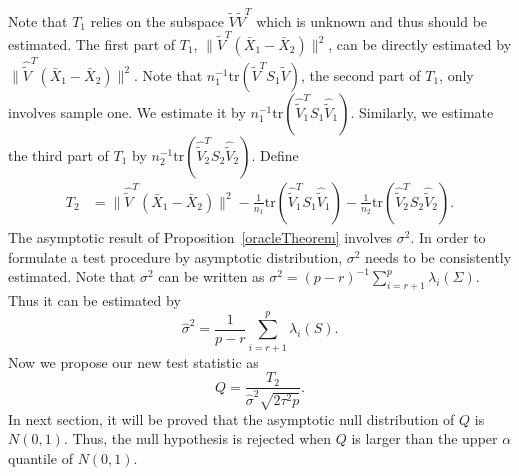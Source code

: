 \documentclass[review]{elsarticle}
\theoremstyle{plain}
\theoremstyle{definition}
\newtheorem{remark}{\quad\quad Remark}
\theoremstyle{remark}
\begin{document}
Note that $T_1$ relies on the subspace $\tilde{V}\tilde{V}^T$ which is unknown and thus should be estimated.
The first part of $T_1$, $\|\tilde{V}^T (\bar{X}_1-\bar{X}_2)\|^2$,
 can be directly estimated by $\|\hat{\tilde{V}}^T (\bar{X}_1-\bar{X}_2)\|^2$.
Note that ${n_1^{-1}}\mathrm{tr}(\tilde{V}^T S_1\tilde{V})$, the second part of $T_1$, only involves sample one.
We estimate it by ${n_1^{-1}}\mathrm{tr}(\hat{\tilde{V}}_1^T S_1\hat{\tilde{V}}_1)$.
Similarly, we estimate the third part of $T_1$ by ${n_2^{-1}}\mathrm{tr}(\hat{\tilde{V}}_2^T S_2\hat{\tilde{V}}_2)$.
Define
\begin{equation*}
\begin{aligned}
    T_2&=\|\hat{\tilde{V}}^T(\bar{X}_1-\bar{X}_2)\|^2-\frac{1}{n_1}\mathrm{tr}(\hat{\tilde{V}}_1^T S_1\hat{\tilde{V}}_1)-\frac{1}{n_2}\mathrm{tr}(\hat{\tilde{V}}_2^T S_2\hat{\tilde{V}}_2).
\end{aligned}
\end{equation*}
The asymptotic result of Proposition~\ref{oracleTheorem} involves $\sigma^2$.
In order to formulate a test procedure by asymptotic distribution, $\sigma^2$ needs to be consistently estimated.
Note that $\sigma^2$ can be written as
    $\sigma^2={(p-r)}^{-1}\sum_{i=r+1}^{p}\lambda_i(\Sigma)$.
Thus it can be estimated by
\begin{equation*}
    \hat{\sigma}^2=\frac{1}{p-r}\sum_{i=r+1}^{p} \lambda_i(S).
\end{equation*}
Now we propose our new test statistic as
\begin{equation}\label{myTest}
    Q=\frac{T_2}{\hat{\sigma}^2\sqrt{2\tau^2 p}}.
\end{equation}
In next section, it will be proved that  the asymptotic null distribution of $Q$ is $N(0,1)$. Thus, the null hypothesis is rejected when $Q$ is larger than the upper $\alpha$ quantile of $N(0,1)$.

\end{document}
